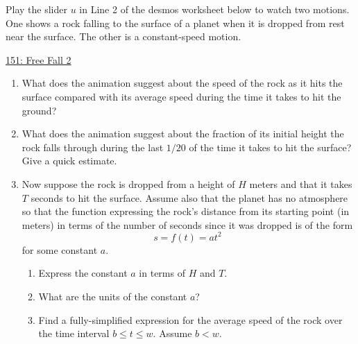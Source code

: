 \documentclass{ximera}
\begin{document}
\begin{question} \label{Qd90t90ette}
Play the slider $u$ in Line 2 of the desmos worksheet below to watch two motions. One shows a rock falling to the surface of a planet when it is dropped from rest near the surface. The other is a constant-speed motion.

\begin{onlineOnly}
    \begin{center}
\end{center}
\end{onlineOnly}

\href{https://www.desmos.com/calculator/dmlrxahkld}{151: Free Fall 2}

\begin{enumerate}

\item What does the animation suggest about the speed of the rock as it hits the surface compared with its average speed during the time it takes to hit the ground?

\item What does the animation suggest about the fraction of its initial height the rock falls through during the last $1/20$ of the time it takes to hit the surface? Give a quick estimate.

\item Now suppose the rock is dropped from a height of $H$ meters and that it takes $T$ seconds to hit the surface. Assume also that the planet has no atmosphere so that the function expressing the rock's distance from its starting point (in meters) in terms of the number of seconds since it was dropped is of the form
\[
      s = f(t) = at^2 \
\]  
for some constant $a$.

\begin{enumerate}

\item Express the constant $a$ in terms of $H$ and $T$. 

\item What are the units of the constant $a$?



\item Find a fully-simplified expression for the average speed of the rock over the time interval $b\leq t \leq w$. Assume $b<w$.


\end{enumerate}
\end{enumerate}
\end{question}
\end{document}
